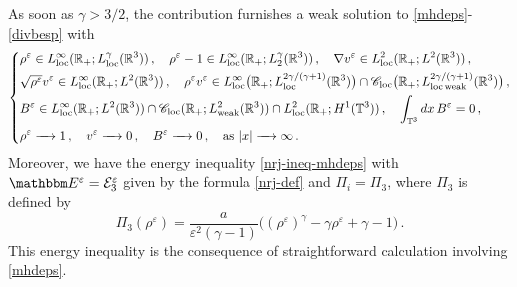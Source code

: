 \documentclass[11pt,reqno]{amsart}
\def \R{{\mathbb{R}}}
\def \T{{\mathbb{T}}}
\begin{document}
As soon as $\gamma>3/2$, the contribution  \cite{HW10} furnishes a  weak solution to \eqref{mhdeps}-\eqref{divbesp} with
\begin{equation}
  \label{reg-ws-mhdeps-R}
  \left\{
  \begin{aligned}
    &\rho^\varepsilon \in L_{\rm loc}^\infty(\R_+; L_{\rm loc}^\gamma(\R^3))\,, \quad \rho^\varepsilon -1 \in L_{\rm loc}^\infty(\R_+; L_2^\gamma(\R^3))\,,
    \quad  \nabla v^\varepsilon \in   L_{\rm loc}^2(\R_+; L^2(\R^3))\,, \\
    & \sqrt{\rho^\varepsilon}v^\varepsilon \in  L_{\rm loc}^\infty(\R_+; L^2(\R^3))\,, \quad \rho^\varepsilon v^\varepsilon
    \in  L_{\rm loc}^\infty\big(\R_+; L_{\rm loc}^{2\gamma/(\gamma+1)}(\R^3)\big) \cap\mathscr{C}_{\rm loc}\big(\R_+; L_{\rm loc \, weak}^{2\gamma/(\gamma+1)}(\R^3)\big) \,,\\
    & B^\varepsilon \in L_{\rm loc}^\infty(\R_+; L^2(\R^3))\cap  \mathscr{C}_{\rm loc}(\R_+; L_{\rm weak}^2(\R^3))  \cap  L_{\rm loc}^2(\R_+; H^1(\T^3))\,, \quad  \int_{\T^3} dx \, B^\varepsilon=0 \,,\\
    & \rho^\varepsilon \xrightarrow{\quad} 1\,, \quad v^\varepsilon \xrightarrow{\quad} 0\,, \quad
    B^\varepsilon \xrightarrow{\quad} 0\,, \quad \mbox{as } |x| \xrightarrow{\quad} \infty\,.
  \end{aligned}
  \right.
\end{equation}
Moreover, we have the energy inequality \eqref{nrj-ineq-mhdeps} with $\mathbbm E^\varepsilon= \mathcal{E}_3^\varepsilon$ given by the formula \eqref{nrj-def} and $\Pi_i=\Pi_3$, where $\Pi_3$ is defined by
\begin{equation}
\label{defPI-R}
\Pi_3(\rho^\varepsilon)=\frac{a}{\varepsilon^2(\gamma-1)}\big( (\rho^\varepsilon)^\gamma
- \gamma \rho^\varepsilon + \gamma - 1\big)\,.
\end{equation}
This energy inequality is the consequence of straightforward calculation involving \eqref{mhdeps}.
\end{document}
